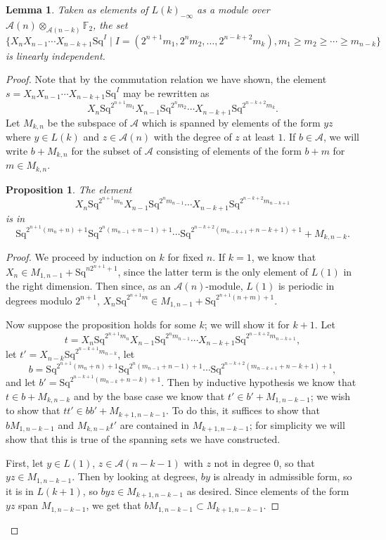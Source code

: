 \documentclass{article}
\newcommand{\A}{\mathcal{A}}
\newcommand{\F}{\mathbb{F}}
\newcommand{\Sq}{\mathrm{Sq}}
\newtheorem{prop}{Proposition}
\newtheorem{lem}{Lemma}
\begin{document}
  \begin{lem}\label{lem:linearly-independent}
    Taken as elements of $L(k)_{-\infty}$ as a module over $\A(n)\otimes_{\A(n-k)}\F_2$, the set
    \[\{X_nX_{n-1}\cdots X_{n-k+1}\Sq^I\mid I=(2^{n+1}m_1,2^nm_2,\ldots,2^{n-k+2}m_k), m_1\geq m_2\geq\cdots\geq m_{n-k}\}\]
    is linearly independent.
  \end{lem}
  \begin{proof}
    Note that by the commutation relation we have shown, the element $s=X_nX_{n-1}\cdots X_{n-k+1}\Sq^I$ may be rewritten as
    \[X_n\Sq^{2^{n+1}m_1}X_{n-1}\Sq^{2^nm_2}\cdots X_{n-k+1}\Sq^{2^{n-k+2}m_k}.\]
    Let $M_{k,n}$ be the subspace of $\A$ which is spanned by elements of the form $yz$ where $y\in L(k)$ and $z\in \A(n)$ with the degree of $z$ at least $1$.  If $b\in \A$, we will write $b+M_{k,n}$ for the subset of $\A$ consisting of elements of the form $b+m$ for $m\in M_{k,n}$.

    \begin{prop}\label{prop:m-thing}
      The element
      \[X_n\Sq^{2^{n+1}m_n}X_{n-1}\Sq^{2^nm_{n-1}}\cdots X_{n-k+1}\Sq^{2^{n-k+2}m_{n-k+1}}\]
      is in
      \[\Sq^{2^{n+1}(m_n+n)+1}\Sq^{2^n(m_{n-1}+n-1)+1}\cdots\Sq^{2^{n-k+2}(m_{n-k+1}+n-k+1)+1} + M_{k,n-k}.\]
    \end{prop}
    \begin{proof}

    We proceed by induction on $k$ for fixed $n$.  If $k=1$, we know that $X_n\in M_{1,n-1}+\Sq^{n2^{n+1}+1}$, since the latter term is the only element of $L(1)$ in the right dimension.  Then since, as an $\A(n)$-module, $L(1)$ is periodic in degrees modulo $2^{n+1}$, $X_n\Sq^{2^{n+1}m}\in M_{1,n-1}+\Sq^{2^{n+1}(n+m)+1}$.

    Now suppose the proposition holds for some $k$; we will show it for $k+1$.  Let 
    \[t=X_n\Sq^{2^{n+1}m_n}X_{n-1}\Sq^{2^nm_{n-1}}\cdots X_{n-k+1}\Sq^{2^{n-k+2}m_{n-k+1}},\]
    let $t'=X_{n-k}\Sq^{2^{n-k+1}m_{n-k}}$, let
    \[b=\Sq^{2^{n+1}(m_n+n)+1}\Sq^{2^n(m_{n-1}+n-1)+1}\cdots\Sq^{2^{n-k+2}(m_{n-k+1}+n-k+1)+1},\]
    and let $b'=\Sq^{2^{n-k+1}(m_{n-k}+n-k)+1}$.  Then by inductive hypothesis we know that $t\in b+M_{k,n-k}$ and by the base case we know that $t'\in b'+M_{1,n-k-1}$; we wish to show that $tt'\in bb'+M_{k+1,n-k-1}$.  To do this, it suffices to show that $bM_{1,n-k-1}$ and $M_{k,n-k}t'$ are contained in $M_{k+1,n-k-1}$; for simplicity we will show that this is true of the spanning sets we have constructed.
    
    First, let $y\in L(1)$, $z\in \A(n-k-1)$ with $z$ not in degree $0$, so that $yz\in M_{1,n-k-1}$.  Then by looking at degrees, $by$ is already in admissible form, so it is in $L(k+1)$, so $byz\in M_{k+1,n-k-1}$ as desired.  Since elements of the form $yz$ span $M_{1,n-k-1}$, we get that $bM_{1,n-k-1}\subset M_{k+1,n-k-1}$.


\end{proof}
\end{proof}
\end{document}
